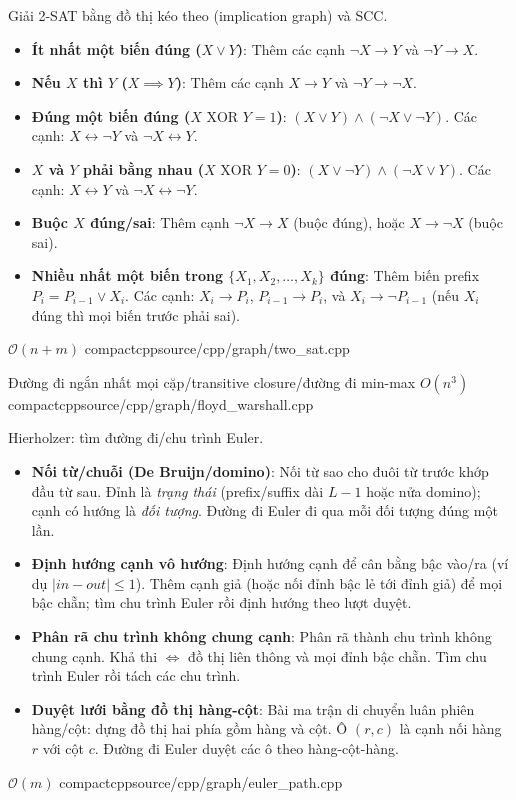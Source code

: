 {Giải 2-SAT bằng đồ thị kéo theo (implication graph) và SCC.
\begin{itemize}
    \item \textbf{Ít nhất một biến đúng ($X \lor Y$)}: Thêm các cạnh $\neg X \to Y$ và $\neg Y \to X$.
    \item \textbf{Nếu $X$ thì $Y$ ($X \implies Y$)}: Thêm các cạnh $X \to Y$ và $\neg Y \to \neg X$.
    \item \textbf{Đúng một biến đúng ($X \text{ XOR } Y = 1$)}: $(X \lor Y) \land (\neg X \lor \neg Y)$. Các cạnh: $X \leftrightarrow \neg Y$ và $\neg X \leftrightarrow Y$.
    \item \textbf{$X$ và $Y$ phải bằng nhau ($X \text{ XOR } Y = 0$)}: $(X \lor \neg Y) \land (\neg X \lor Y)$. Các cạnh: $X \leftrightarrow Y$ và $\neg X \leftrightarrow \neg Y$.
    \item \textbf{Buộc $X$ đúng/sai}: Thêm cạnh $\neg X \to X$ (buộc đúng), hoặc $X \to \neg X$ (buộc sai).
    \item \textbf{Nhiều nhất một biến trong $\{X_1, X_2, \dots, X_k\}$ đúng}: Thêm biến prefix $P_i = P_{i-1} \lor X_i$. Các cạnh: $X_i \to P_i$, $P_{i-1} \to P_i$, và $X_i \to \neg P_{i-1}$ (nếu $X_i$ đúng thì mọi biến trước phải sai).
\end{itemize}
}
{$\mathcal{O}(n + m)$}
{compactcpp}{source/cpp/graph/two_sat.cpp}

{Đường đi ngắn nhất mọi cặp/transitive closure/đường đi min-max}
{$O(n^3)$}
{compactcpp}{source/cpp/graph/floyd_warshall.cpp}

{Hierholzer: tìm đường đi/chu trình Euler.
\begin{itemize}
    \item \textbf{Nối từ/chuỗi (De Bruijn/domino)}: Nối từ sao cho đuôi từ trước khớp đầu từ sau. Đỉnh là \textit{trạng thái} (prefix/suffix dài $L-1$ hoặc nửa domino); cạnh có hướng là \textit{đối tượng}. Đường đi Euler đi qua mỗi đối tượng đúng một lần.
    \item \textbf{Định hướng cạnh vô hướng}: Định hướng cạnh để cân bằng bậc vào/ra (ví dụ $|in-out|\le1$). Thêm cạnh giả (hoặc nối đỉnh bậc lẻ tới đỉnh giả) để mọi bậc chẵn; tìm chu trình Euler rồi định hướng theo lượt duyệt.
    \item \textbf{Phân rã chu trình không chung cạnh}: Phân rã thành chu trình không chung cạnh. Khả thi $\iff$ đồ thị liên thông và mọi đỉnh bậc chẵn. Tìm chu trình Euler rồi tách các chu trình.
    \item \textbf{Duyệt lưới bằng đồ thị hàng-cột}: Bài ma trận di chuyển luân phiên hàng/cột: dựng đồ thị hai phía gồm hàng và cột. Ô $(r,c)$ là cạnh nối hàng $r$ với cột $c$. Đường đi Euler duyệt các ô theo hàng-cột-hàng.
\end{itemize}
}
{$\mathcal{O}(m)$}
{compactcpp}{source/cpp/graph/euler_path.cpp}

